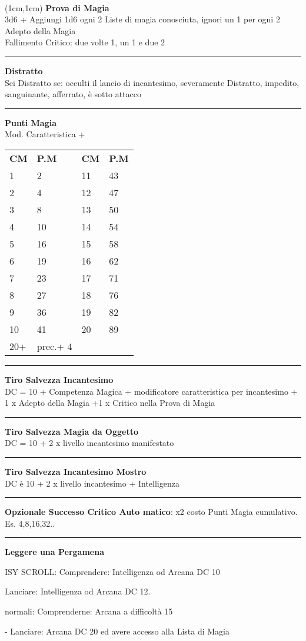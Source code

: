 \documentclass[a4paper,12 pt,openany]{book}
\newcommand{\riga}{\rule{\textwidth}{0.4pt}}
\begin{document}
~\newpage

\begin{textblock*}{5cm}(1cm,1cm) %
\textbf{Prova di Magia}\\
3d6 + Aggiungi 1d6 ogni 2 Liste di magia conosciuta, ignori un 1 per ogni 2 Adepto della Magia\\
Fallimento Critico: due volte 1, un 1 e due 2\\


\riga

\textbf{Distratto}\\
Sei Distratto se: occulti il lancio di incantesimo, severamente Distratto, impedito, sanguinante, afferrato, è sotto attacco\\

\riga

\textbf{Punti Magia}\\
Mod. Caratteristica + \\

\begin{tabular}{ll|ll}
\textbf{CM} & \textbf{P.M}&	\textbf{CM} & \textbf{P.M}\\
	1&	2 	&11&43\\
2&	4	&12&47\\
3&	8	&13&50\\
4&	10	&14&54\\
5&	16	&15&58\\
6&	19	&16&62\\
7&	23	&17&71\\
8&	27	&18&76\\
9&	36	&19&82\\
10&	41	&20&89\\
20+&prec.+ 4&&\\
\end{tabular}

\riga

\textbf{Tiro Salvezza Incantesimo}\\
DC = 10 + Competenza Magica + modificatore caratteristica per incantesimo + 1 x Adepto della Magia +1 x Critico nella Prova di Magia

\riga

\textbf{Tiro Salvezza Magia da Oggetto}\\
DC = 10 + 2 x livello incantesimo manifestato

\riga

\textbf{Tiro Salvezza Incantesimo Mostro}\\
DC è 10 + 2 x livello incantesimo + Intelligenza

\riga

\textbf{Opzionale Successo Critico Auto matico}:  x2 costo Punti Magia cumulativo. Es. 4,8,16,32..

\riga

\textbf{Leggere una Pergamena}
	
	ISY SCROLL: Comprendere: Intelligenza od Arcana DC 10
	
	Lanciare: Intelligenza od Arcana DC 12.
	
	normali: Comprenderne: Arcana a difficoltà 15
	
	- Lanciare: Arcana DC 20 ed avere accesso alla Lista di Magia

\end{textblock*}
\end{document}
